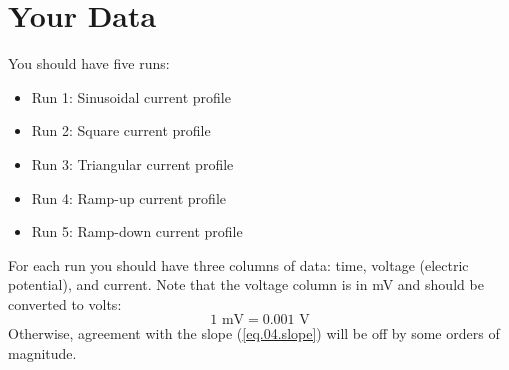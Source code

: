 \section{Your Data}
You should have five runs:
\begin{itemize}
	\item Run 1: Sinusoidal current profile
	\item Run 2: Square current profile
	\item Run 3: Triangular current profile
	\item Run 4: Ramp-up current profile
	\item Run 5: Ramp-down current profile
\end{itemize}
For each run you should have three columns of data: time, voltage (electric potential), and current. Note that the voltage column is in mV and should be converted to volts:
\begin{equation}
	1 \text{ mV} = 0.001 \text{ V}
\end{equation}
Otherwise, agreement with the slope (\ref{eq.04.slope}) will be off by some orders of magnitude.
\newpage
